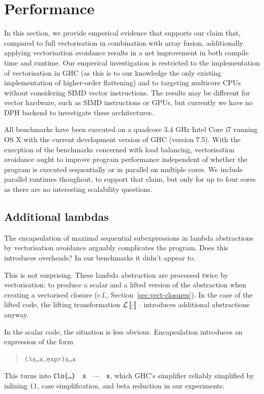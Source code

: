 \section{Performance}
\label{Section:Performance}

In this section, we provide emperical evidence that supports our claim that, compared to full vectorisation in combination with array fusion, additionally applying vectorisation avoidance results in a net improvement in both compile time and runtime. Our emperical investigation is restricted to the implementation of vectorisation in GHC (as this is to our knowledge the only existing implementation of higher-order flattening) and to targeting multicore CPUs without considering SIMD vector instructions. The results may be different for vector hardware, such as SIMD instructions or GPUs, but currently we have no DPH backend to investigate these architectures.

All benchmarks have been executed on a quadcore 3.4 GHz Intel Core i7 running OS X with the current development version of GHC (version 7.5). With the execption of the benchmarks concerned with load balancing, vectorisation avoidance ought to improve program performance independent of whether the program is executed sequentially or in parallel on multiple cores. We include parallel runtimes thoughout, to support that claim, but only for up to four cores as there are no interesting scalability questions.

\subsection{Additional lambdas}

The encapsulation of maximal sequential subexpressions in lambda abstractions by vectorisation avoidance arguably complicates the program. Does this introduces overheads? In our benchmarks it didn't appear to.

This is not surprising. These lambda abstraction are processed twice by vectorisation: to produce a scalar and a lifted version of the abstraction when creating a vectorised closure (c.f., Section~\ref{sec:vect-closures}). In the case of the lifted code, the lifting transformation \(\mathcal{L}\left\llbracket \cdot \right\rrbracket\,\cdot\) introduces additional abstractions anyway. 

In the scalar code, the situation is less obvious. Encapsulation introduces an expression of the form
%
\begin{quote}\small
\begin{alltt}
(\(\lambda\)x \ldots x. expr) x \ldots x
\end{alltt}
\end{quote}
%
This turns into \texttt{Clo\{\ldots\} \capp\ x \capp\ $\cdots$ \capp\ x}, which GHC's simplifier reliably simplified by inlining \texttt{(\capp)}, case simplification, and beta reduction in our experiments. 

